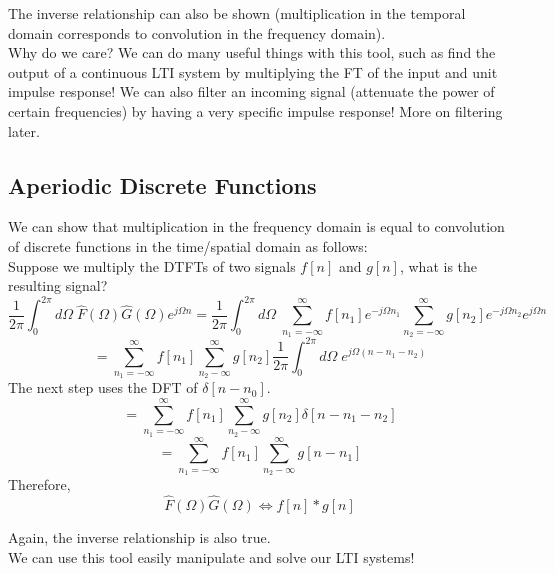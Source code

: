 \documentclass[a4paper]{article}
\numberwithin{equation}{section}
\begin{document}
The inverse relationship can also be shown (multiplication in the temporal domain corresponds to convolution in the frequency domain). \\


Why do we care? We can do many useful things with this tool, such as find the output of a continuous LTI system by multiplying the FT of the input and unit impulse response! We can also filter an incoming signal (attenuate the power of certain frequencies) by having a very specific impulse response! More on filtering later. 

\subsection{Aperiodic Discrete Functions}
We can show that multiplication in the frequency domain is equal to convolution of discrete functions in the time/spatial domain as follows:\\

Suppose we multiply the DTFTs of two signals $f[n]$ and $g[n]$, what is the resulting signal?
\begin{equation}
\frac{1}{2\pi}\int_{0}^{2\pi}d\Omega \; \hat{F}(\Omega)\hat{G}(\Omega)e^{j\Omega n}=\frac{1}{2\pi}\int_{0}^{2\pi}d\Omega \; \sum_{n_1=-\infty}^{\infty} f[n_1]e^{-j\Omega n_1}\sum_{n_2=-\infty}^{\infty}g[n_2]e^{-j\Omega n_2}e^{j\Omega n}
\end{equation}
\begin{equation}
=\sum_{n_1=-\infty}^{\infty} f[n_1]\sum_{n_2-\infty}^{\infty}g[n_2]\frac{1}{2\pi}\int_{0}^{2\pi}d\Omega \; e^{j\Omega (n-n_1-n_2)}
\end{equation}
The next step uses the DFT of $\delta[n-n_0]$. 
\begin{equation}
=\sum_{n_1=-\infty}^{\infty} f[n_1]\sum_{n_2-\infty}^{\infty}g[n_2]\delta[n-n_1-n_2]
\end{equation}
\begin{equation}
=\sum_{n_1=-\infty}^{\infty} f[n_1]\sum_{n_2-\infty}^{\infty}g[n-n_1]
\end{equation}
Therefore,
\begin{equation}\boxed{
\hat{F}(\Omega)\hat{G}(\Omega) \Longleftrightarrow f[n]*g[n]}
\end{equation}

Again, the inverse relationship is also true. \\

We can use this tool easily manipulate and solve our LTI systems!
\end{document}
